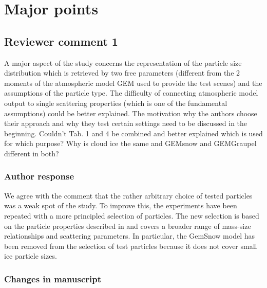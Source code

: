 
\section{Major points}

\subsection*{Reviewer comment 1}

A major aspect of the study concerns the representation of the particle size
distribution which is retrieved by two free parameters (different from the 2
moments of the atmospheric model GEM used to provide the test scenes) and the
assumptions of the particle type. The difficulty of connecting atmospheric model
output to single scattering properties (which is one of the fundamental
assumptions) could be better explained. The motivation why the authors choose
their approach and why they test certain settings need to be discussed in the
beginning. Couldn’t Tab. 1 and 4 be combined and better explained which is used
for which purpose? Why is cloud ice the same and GEMsnow and GEMGraupel different
in both?

\subsubsection*{Author response}

We agree with the comment that the rather arbitrary choice of tested particles
was a weak spot of the study. To improve this, the experiments have been repeated
with a more principled selection of particles. The new selection is based on the
particle properties described in \citet{ekelund20} and covers a broader range of
mass-size relationships and scattering parameters. In particular, the GemSnow
model has been removed from the selection of test particles because it does not
cover small ice particle sizes.

\subsubsection{Changes in manuscript}


